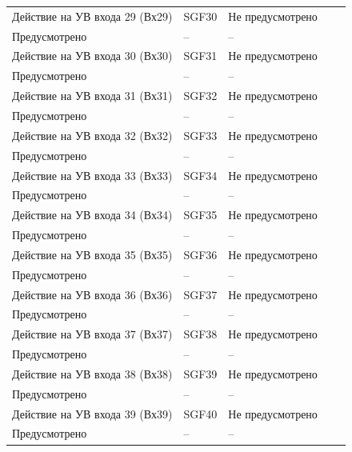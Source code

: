 \begin{longtable}{|>{\centering\arraybackslash}m{5.3cm}|>{\centering\arraybackslash}m{3.3cm}|>{\centering\arraybackslash}m{4.2cm}|>{\centering\arraybackslash}m{1.8cm}|>{\centering\arraybackslash}m{1cm}|}
\hline
\centering Действие на УВ входа 29 (Вх29)  & \centering SGF30 & \centering Не предусмотрено \\ Предусмотрено & \centering -- & \centering \arraybackslash -- \\
\hline
\centering Действие на УВ входа 30 (Вх30)  & \centering SGF31 & \centering Не предусмотрено \\ Предусмотрено & \centering -- & \centering \arraybackslash -- \\
\hline
\centering Действие на УВ входа 31 (Вх31)  & \centering SGF32 & \centering Не предусмотрено \\ Предусмотрено & \centering -- & \centering \arraybackslash -- \\
\hline
\centering Действие на УВ входа 32 (Вх32)  & \centering SGF33 & \centering Не предусмотрено \\ Предусмотрено & \centering -- & \centering \arraybackslash -- \\
\hline
\centering Действие на УВ входа 33 (Вх33)  & \centering SGF34 & \centering Не предусмотрено \\ Предусмотрено & \centering -- & \centering \arraybackslash -- \\
\hline
\centering Действие на УВ входа 34 (Вх34)  & \centering SGF35 & \centering Не предусмотрено \\ Предусмотрено & \centering -- & \centering \arraybackslash -- \\
\hline
\centering Действие на УВ входа 35 (Вх35)  & \centering SGF36 & \centering Не предусмотрено \\ Предусмотрено & \centering -- & \centering \arraybackslash -- \\
\hline
\centering Действие на УВ входа 36 (Вх36)  & \centering SGF37 & \centering Не предусмотрено \\ Предусмотрено & \centering -- & \centering \arraybackslash -- \\
\hline
\centering Действие на УВ входа 37 (Вх37)  & \centering SGF38 & \centering Не предусмотрено \\ Предусмотрено & \centering -- & \centering \arraybackslash -- \\
\hline
\centering Действие на УВ входа 38 (Вх38)  & \centering SGF39 & \centering Не предусмотрено \\ Предусмотрено & \centering -- & \centering \arraybackslash -- \\
\hline
\centering Действие на УВ входа 39 (Вх39)  & \centering SGF40 & \centering Не предусмотрено \\ Предусмотрено & \centering -- & \centering \arraybackslash -- \\

\end{longtable}
